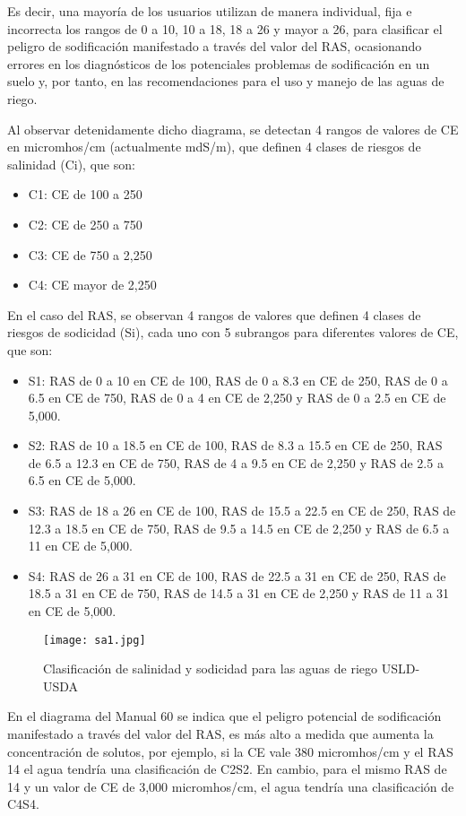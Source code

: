 
Es decir, una mayoría de los usuarios utilizan de manera individual, fija e incorrecta los rangos de 0 a 10, 10 a 18, 18 a 26 y mayor a 26, para clasificar el peligro de sodificación manifestado a través del valor del RAS, ocasionando errores en los diagnósticos de los potenciales problemas de sodificación en un suelo y, por tanto, en las recomendaciones para el uso y manejo de las aguas de riego.

Al observar detenidamente dicho diagrama, se detectan 4 rangos de valores de CE en micromhos/cm (actualmente mdS/m), que definen 4 clases de riesgos de salinidad (Ci), que son:
\begin{itemize}
  \item C1: CE de 100 a 250
  \item C2: CE de 250 a 750
  \item C3: CE de 750 a 2,250
  \item C4: CE mayor de 2,250
\end{itemize}
En el caso del RAS, se observan 4 rangos de valores que definen 4 clases de
riesgos de sodicidad (Si), cada uno con 5 subrangos para diferentes valores de CE,
que son:
\begin{itemize}
  \item S1: RAS de 0 a 10 en CE de 100, RAS de 0 a 8.3 en CE de 250, RAS de 0 a 6.5 en CE de 750, RAS de 0 a 4 en CE de 2,250 y RAS de 0 a 2.5 en CE de 5,000.
  \item S2: RAS de 10 a 18.5 en CE de 100, RAS de 8.3 a 15.5 en CE de 250, RAS de 6.5 a 12.3 en CE de 750, RAS de 4 a 9.5 en CE de 2,250 y RAS de 2.5 a 6.5 en CE de 5,000.
  \item S3: RAS de 18 a 26 en CE de 100, RAS de 15.5 a 22.5 en CE de 250, RAS de 12.3 a 18.5 en CE de 750, RAS de 9.5 a 14.5 en CE de 2,250 y RAS de 6.5 a 11 en CE de 5,000.
  \item S4: RAS de 26 a 31 en CE de 100, RAS de 22.5 a 31 en CE de 250, RAS de 18.5 a 31 en CE de 750, RAS de 14.5 a 31 en CE de 2,250 y RAS de 11 a 31 en CE de 5,000.
\end{itemize}
\begin{figure}[h!]
\centering
  \texttt{[image: sa1.jpg]}
  \caption{Clasificación de salinidad y sodicidad para las aguas de riego USLD-USDA}
  \label{sa1}
\end{figure}
En el diagrama del Manual 60 se indica que el peligro potencial de sodificación manifestado a través del valor del RAS, es más alto a medida que aumenta la concentración de solutos, por ejemplo, si la CE vale 380 micromhos/cm y el RAS 14 el agua tendría una clasificación de C2S2. En cambio, para el mismo RAS de 14 y un valor de CE de 3,000 micromhos/cm, el agua tendría una clasificación de C4S4.

